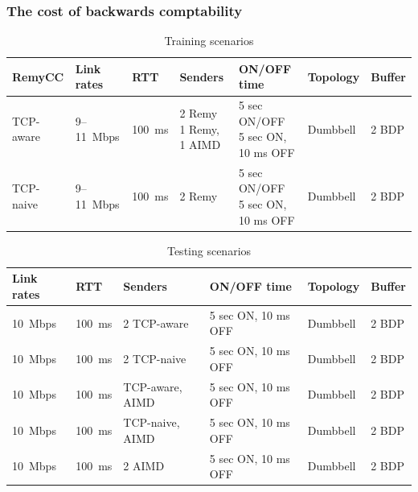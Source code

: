 \begin{frame}
\frametitle{The cost of backwards comptability}
\begin{table}
\begin{center}
\begin{tiny}
\begin{tabular}{l|l|l|l|l|l|l|}
\bf RemyCC & \bf Link rates & \bf RTT & \bf Senders & ON/OFF time & Topology & Buffer \\
\hline
TCP-aware  & 9--11~Mbps & 100~ms & \pbox{2.5cm}{2 Remy \\ 1 Remy, 1 AIMD}  & \pbox{2.5cm}{5 sec ON/OFF \\ 5 sec ON, 10 ms OFF} & Dumbbell & 2 BDP\\
\hline
TCP-naive  & 9--11~Mbps & 100~ms & 2 Remy  & \pbox{2.5cm}{5 sec ON/OFF \\ 5 sec ON, 10 ms OFF} & Dumbbell & 2 BDP\\
\hline
\end{tabular}
\end{tiny}
\caption{Training scenarios}
\label{table:oprange}
\end{center}
\end{table}
\begin{table}
\begin{center}
\begin{tiny}
\begin{tabular}{l|l|l|l|l|l|}
\bf Link rates & \bf RTT & \bf Senders & ON/OFF time & Topology & Buffer \\
\hline
10~Mbps & 100~ms & 2 TCP-aware & 5 sec ON, 10 ms OFF & Dumbbell & 2 BDP\\
10~Mbps & 100~ms & 2 TCP-naive & 5 sec ON, 10 ms OFF & Dumbbell & 2 BDP\\
10~Mbps & 100~ms & TCP-aware, AIMD & 5 sec ON, 10 ms OFF & Dumbbell & 2 BDP\\
10~Mbps & 100~ms & TCP-naive, AIMD & 5 sec ON, 10 ms OFF & Dumbbell & 2 BDP\\
10~Mbps & 100~ms & 2 AIMD  & 5 sec ON, 10 ms OFF & Dumbbell & 2 BDP\\
\end{tabular}
\end{tiny}
\caption{Testing scenarios}
\label{table:oprange}
\end{center}
\end{table}

\end{frame}

